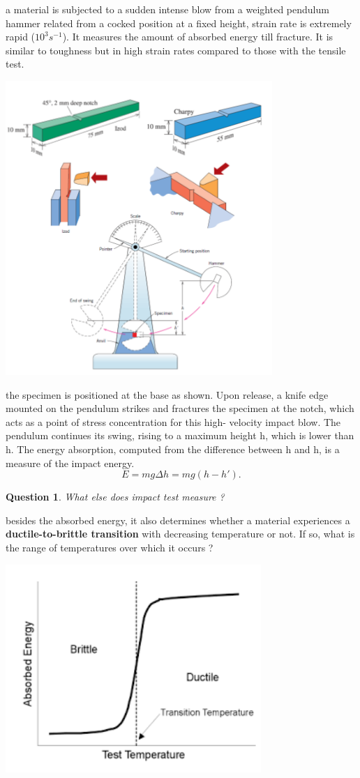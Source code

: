 \documentclass[13]{article}
\newtheorem{exer}{Question}
\begin{document}
a material is subjected to a sudden intense blow from a weighted pendulum hammer related from a cocked position at a fixed height, strain rate is extremely rapid ($10^3 s^{-1}$). It measures the amount of absorbed energy till fracture. It is similar to toughness but in high strain rates compared to those with the tensile test.
\begin{center}
\includegraphics[scale=0.5]{figures/30.png}
\end{center}
the specimen is positioned at the base as shown. Upon release, a knife edge
mounted on the pendulum strikes and fractures the specimen at the notch,
which acts as a point of stress concentration for this high- velocity impact
blow. The pendulum continues its swing, rising to a maximum height h, which
is lower than h. The energy absorption, computed from the difference between
h and h, is a measure of the impact energy.
\[
	E = mg\Delta h = mg(h-h')
.\] 
\begin{exer}
	What else does impact test measure  ?
\end{exer}
besides the absorbed energy, it also determines whether a material experiences a \textbf{ductile-to-brittle transition} with decreasing temperature or not. If so, what is the range of temperatures over which it occurs ?
\begin{center}
\includegraphics[scale=0.5]{figures/31.png}
\end{center}
\end{document}
